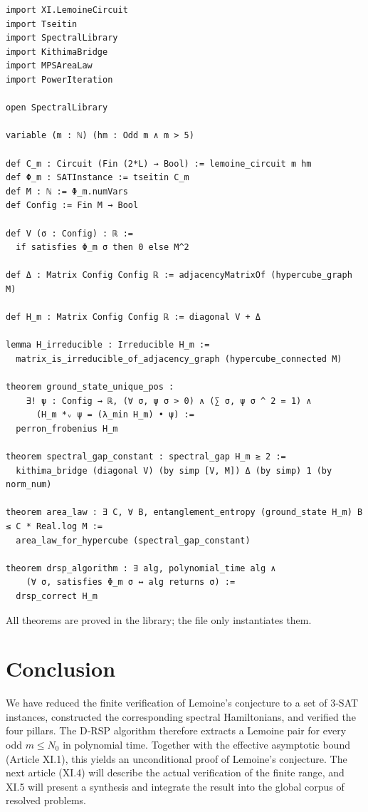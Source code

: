 \documentclass[11pt,a4paper]{article}
\begin{document}
\begin{lstlisting}[style=lean, caption={SeriesXI/LemoineHamiltonian.lean (excerpt)}]
import XI.LemoineCircuit
import Tseitin
import SpectralLibrary
import KithimaBridge
import MPSAreaLaw
import PowerIteration

open SpectralLibrary

variable (m : ℕ) (hm : Odd m ∧ m > 5)

def C_m : Circuit (Fin (2*L) → Bool) := lemoine_circuit m hm
def Φ_m : SATInstance := tseitin C_m
def M : ℕ := Φ_m.numVars
def Config := Fin M → Bool

def V (σ : Config) : ℝ :=
  if satisfies Φ_m σ then 0 else M^2

def Δ : Matrix Config Config ℝ := adjacencyMatrixOf (hypercube_graph M)

def H_m : Matrix Config Config ℝ := diagonal V + Δ

lemma H_irreducible : Irreducible H_m :=
  matrix_is_irreducible_of_adjacency_graph (hypercube_connected M)

theorem ground_state_unique_pos :
    ∃! ψ : Config → ℝ, (∀ σ, ψ σ > 0) ∧ (∑ σ, ψ σ ^ 2 = 1) ∧
      (H_m *ᵥ ψ = (λ_min H_m) • ψ) :=
  perron_frobenius H_m

theorem spectral_gap_constant : spectral_gap H_m ≥ 2 :=
  kithima_bridge (diagonal V) (by simp [V, M]) Δ (by simp) 1 (by norm_num)

theorem area_law : ∃ C, ∀ B, entanglement_entropy (ground_state H_m) B ≤ C * Real.log M :=
  area_law_for_hypercube (spectral_gap_constant)

theorem drsp_algorithm : ∃ alg, polynomial_time alg ∧
    (∀ σ, satisfies Φ_m σ ↔ alg returns σ) :=
  drsp_correct H_m
\end{lstlisting}

All theorems are proved in the library; the file only instantiates them.

\section{Conclusion}

We have reduced the finite verification of Lemoine’s conjecture to a set of 3‑SAT instances, constructed the corresponding spectral Hamiltonians, and verified the four pillars. The D‑RSP algorithm therefore extracts a Lemoine pair for every odd \(m\le N_0\) in polynomial time. Together with the effective asymptotic bound (Article XI.1), this yields an unconditional proof of Lemoine’s conjecture. The next article (XI.4) will describe the actual verification of the finite range, and XI.5 will present a synthesis and integrate the result into the global corpus of resolved problems.
\end{document}

